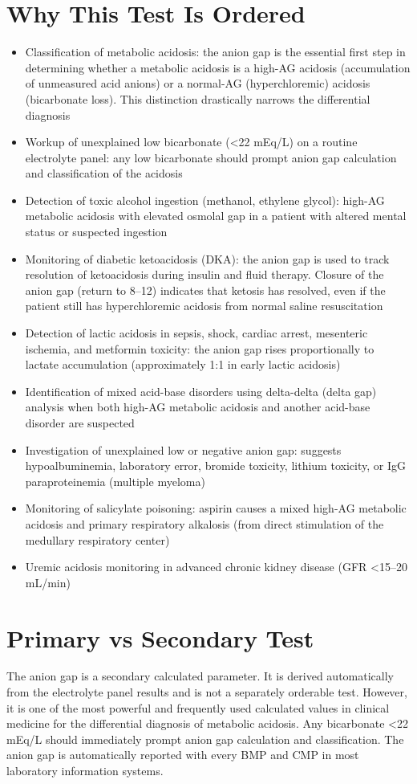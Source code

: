 \section*{Why This Test Is Ordered}
\begin{itemize}
  \item Classification of metabolic acidosis: the anion gap is the essential first step in determining whether a metabolic acidosis is a high-AG acidosis (accumulation of unmeasured acid anions) or a normal-AG (hyperchloremic) acidosis (bicarbonate loss). This distinction drastically narrows the differential diagnosis
  \item Workup of unexplained low bicarbonate (<22 mEq/L) on a routine electrolyte panel: any low bicarbonate should prompt anion gap calculation and classification of the acidosis
  \item Detection of toxic alcohol ingestion (methanol, ethylene glycol): high-AG metabolic acidosis with elevated osmolal gap in a patient with altered mental status or suspected ingestion
  \item Monitoring of diabetic ketoacidosis (DKA): the anion gap is used to track resolution of ketoacidosis during insulin and fluid therapy. Closure of the anion gap (return to 8--12) indicates that ketosis has resolved, even if the patient still has hyperchloremic acidosis from normal saline resuscitation
  \item Detection of lactic acidosis in sepsis, shock, cardiac arrest, mesenteric ischemia, and metformin toxicity: the anion gap rises proportionally to lactate accumulation (approximately 1:1 in early lactic acidosis)
  \item Identification of mixed acid-base disorders using delta-delta (delta gap) analysis when both high-AG metabolic acidosis and another acid-base disorder are suspected
  \item Investigation of unexplained low or negative anion gap: suggests hypoalbuminemia, laboratory error, bromide toxicity, lithium toxicity, or IgG paraproteinemia (multiple myeloma)
  \item Monitoring of salicylate poisoning: aspirin causes a mixed high-AG metabolic acidosis and primary respiratory alkalosis (from direct stimulation of the medullary respiratory center)
  \item Uremic acidosis monitoring in advanced chronic kidney disease (GFR <15--20 mL/min)
\end{itemize}

\section*{Primary vs Secondary Test}
The anion gap is a secondary calculated parameter. It is derived automatically from the electrolyte panel results and is not a separately orderable test. However, it is one of the most powerful and frequently used calculated values in clinical medicine for the differential diagnosis of metabolic acidosis. Any bicarbonate <22 mEq/L should immediately prompt anion gap calculation and classification. The anion gap is automatically reported with every BMP and CMP in most laboratory information systems.

